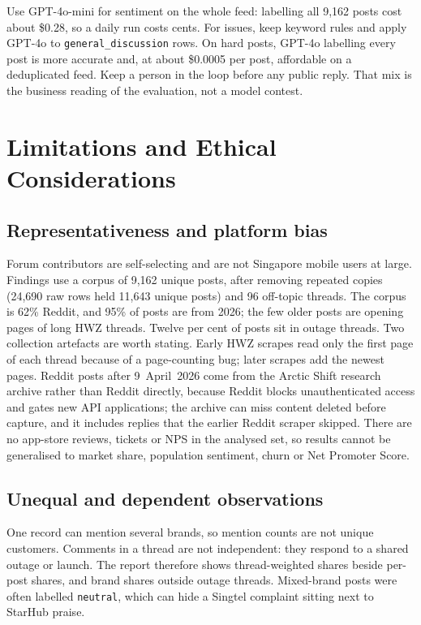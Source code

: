 \documentclass[11pt,a4paper]{article}
\begin{document}
Use GPT-4o-mini for sentiment on the whole feed: labelling all 9,162 posts cost about \$0.28, so a daily run costs cents. For issues, keep keyword rules and apply GPT-4o to \texttt{general\_discussion} rows. On hard posts, GPT-4o labelling every post is more accurate and, at about \$0.0005 per post, affordable on a deduplicated feed. Keep a person in the loop before any public reply. That mix is the business reading of the evaluation, not a model contest.

\section{Limitations and Ethical Considerations}

\subsection{Representativeness and platform bias}

Forum contributors are self-selecting and are not Singapore mobile users at large. Findings use a corpus of 9,162 unique posts, after removing repeated copies (24,690 raw rows held 11,643 unique posts) and 96 off-topic threads. The corpus is 62\% Reddit, and 95\% of posts are from 2026; the few older posts are opening pages of long HWZ threads. Twelve per cent of posts sit in outage threads. Two collection artefacts are worth stating. Early HWZ scrapes read only the first page of each thread because of a page-counting bug; later scrapes add the newest pages. Reddit posts after 9~April~2026 come from the Arctic Shift research archive rather than Reddit directly, because Reddit blocks unauthenticated access and gates new API applications; the archive can miss content deleted before capture, and it includes replies that the earlier Reddit scraper skipped. There are no app-store reviews, tickets or NPS in the analysed set, so results cannot be generalised to market share, population sentiment, churn or Net Promoter Score.

\subsection{Unequal and dependent observations}

One record can mention several brands, so mention counts are not unique customers. Comments in a thread are not independent: they respond to a shared outage or launch. The report therefore shows thread-weighted shares beside per-post shares, and brand shares outside outage threads. Mixed-brand posts were often labelled \texttt{neutral}, which can hide a Singtel complaint sitting next to StarHub praise.
\end{document}
